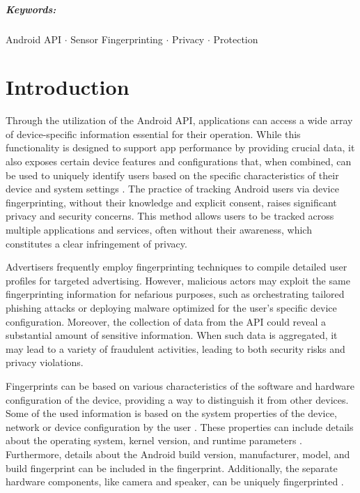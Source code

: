 \documentclass[11pt,
  oneside,openany,    %
]{scrreprt}
\begin{document}
\paragraph{Keywords:}
Android API $\cdot$
Sensor Fingerprinting $\cdot$
Privacy $\cdot$
Protection

\cleardoublepage

\chapter{Introduction}
\label{chap:introduction}

Through the utilization of the Android API, applications can access a wide array of device-specific information essential for their operation.
While this functionality is designed to support app performance by providing crucial data, it also exposes certain device features and configurations that, when combined, can be used to uniquely identify users based on the specific characteristics of their device and system settings \cite{DBLP:conf/IEEEares/PalfingerP20}.
The practice of tracking Android users via device fingerprinting, without their knowledge and explicit consent, raises significant privacy and security concerns.
This method allows users to be tracked across multiple applications and services, often without their awareness, which constitutes a clear infringement of privacy.

Advertisers frequently employ fingerprinting techniques to compile detailed user profiles for targeted advertising.
However, malicious actors may exploit the same fingerprinting information for nefarious purposes, such as orchestrating tailored phishing attacks or deploying malware optimized for the user's specific device configuration.
Moreover, the collection of data from the API could reveal a substantial amount of sensitive information.
When such data is aggregated, it may lead to a variety of fraudulent activities, leading to both security risks and privacy violations.

Fingerprints can be based on various characteristics of the software and hardware configuration of the device, providing a way to distinguish it from other devices.
Some of the used information is based on the system properties of the device, network or device configuration by the user \cite{DBLP:journals/popets/KurtzGBRF16}. 
These properties can include details about the operating system, kernel version, and runtime parameters \cite{DBLP:journals/access/WuWWLY16}.
Furthermore, details about the Android build version, manufacturer, model, and build fingerprint can be included in the fingerprint. 
Additionally, the separate hardware components, like camera and speaker, can be uniquely fingerprinted \cite{DBLP:journals/tifs/Li10, DBLP:journals/popets/DasBC18}.
\end{document}
